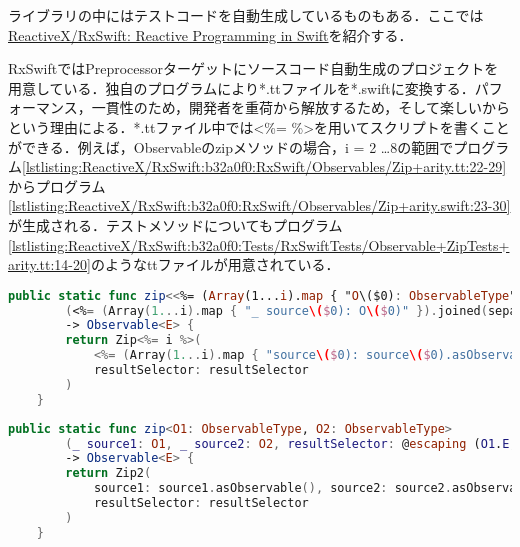 ライブラリの中にはテストコードを自動生成しているものもある．ここでは\href{https://github.com/ReactiveX/RxSwift}{ReactiveX/RxSwift: Reactive Programming in Swift}を紹介する．

RxSwiftではPreprocessorターゲットにソースコード自動生成のプロジェクトを用意している．独自のプログラムにより*.ttファイルを*.swiftに変換する．パフォーマンス，一貫性のため，開発者を重荷から解放するため，そして楽しいからという理由による\cite{github:ReactiveX/RxSwift:Preprocessor/README.md}．*.ttファイル中では{\sf \textless\%= \%\textgreater}を用いてスクリプトを書くことができる．例えば，{\sf Observable}の{\sf zip}メソッドの場合，{\sf i = 2 \ldots 8}の範囲でプログラム\ref{lstlisting:ReactiveX/RxSwift:b32a0f0:RxSwift/Observables/Zip+arity.tt:22-29}からプログラム\ref{lstlisting:ReactiveX/RxSwift:b32a0f0:RxSwift/Observables/Zip+arity.swift:23-30}が生成される．テストメソッドについてもプログラム\ref{lstlisting:ReactiveX/RxSwift:b32a0f0:Tests/RxSwiftTests/Observable+ZipTests+arity.tt:14-20}のようなttファイルが用意されている．

\begin{lstlisting}[language=swift,caption=\href{https://github.com/ReactiveX/RxSwift/blob/b32a0f0d40656672783749d23e2984bf337adcec/RxSwift/Observables/Zip+arity.tt}{{\sf zip}メソッドのテンプレート},label=lstlisting:ReactiveX/RxSwift:b32a0f0:RxSwift/Observables/Zip+arity.tt:22-29,firstnumber=22]
    public static func zip<<%= (Array(1...i).map { "O\($0): ObservableType" }).joined(separator: ", ") %>>
        (<%= (Array(1...i).map { "_ source\($0): O\($0)" }).joined(separator: ", ") %>, resultSelector: @escaping (<%= (Array(1...i).map { "O\($0).E" }).joined(separator: ", ") %>) throws -> E)
        -> Observable<E> {
        return Zip<%= i %>(
            <%= (Array(1...i).map { "source\($0): source\($0).asObservable()" }).joined(separator: ", ") %>,
            resultSelector: resultSelector
        )
    }
\end{lstlisting}

\begin{lstlisting}[language=swift,caption=\href{https://github.com/ReactiveX/RxSwift/blob/b32a0f0d40656672783749d23e2984bf337adcec/RxSwift/Observables/Zip+arity.swift}{自動生成された{\sf zip}メソッド},label=lstlisting:ReactiveX/RxSwift:b32a0f0:RxSwift/Observables/Zip+arity.swift:23-30,firstnumber=23]
    public static func zip<O1: ObservableType, O2: ObservableType>
        (_ source1: O1, _ source2: O2, resultSelector: @escaping (O1.E, O2.E) throws -> E)
        -> Observable<E> {
        return Zip2(
            source1: source1.asObservable(), source2: source2.asObservable(),
            resultSelector: resultSelector
        )
    }
\end{lstlisting}

